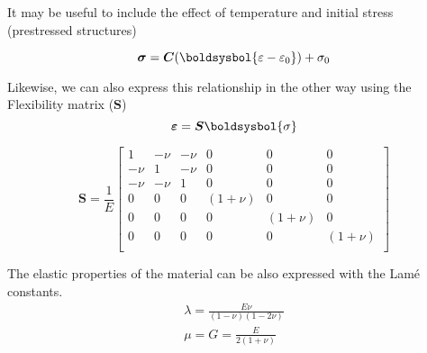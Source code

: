 \documentclass[a4paper, 11pt,article,oneside]{memoir}%
\begin{document}
It may be useful to include the effect of temperature and initial stress (prestressed structures)
\begin{eqbox}
\begin{equation*}
\boldsymbol{\sigma}=\boldsymbol{C}(\boldsysbol{\varepsilon-\varepsilon_0})+\sigma_0
\end{equation*}
\end{eqbox}
Likewise, we can also express this relationship in the other way using the Flexibility matrix ($\boldsymbol{S}$)
\begin{equation*}
\boldsymbol{\varepsilon}=\boldsymbol{S}\boldsysbol{\sigma}
\end{equation*}

\begin{eqbox}
\begin{equation*}
\boldsymbol{S}=\frac{1}{E}
\begin{bmatrix}
1&-\nu&-\nu&0&0&0\\
-\nu&1&-\nu&0&0&0\\
-\nu&-\nu&1&0&0&0\\
0&0&0&(1+\nu)&0&0\\
0&0&0&0&(1+\nu)&0\\
0&0&0&0&0&(1+\nu)\\
\end{bmatrix}
\end{equation*}
\end{eqbox}
The elastic properties of the material can be also expressed with the Lamé constants.
\begin{gather*}
\lambda=\frac{E\nu}{(1-\nu)(1-2\nu)}\\
\mu=G=\frac{E}{2(1+\nu)}
\end{gather*}
\end{document}
